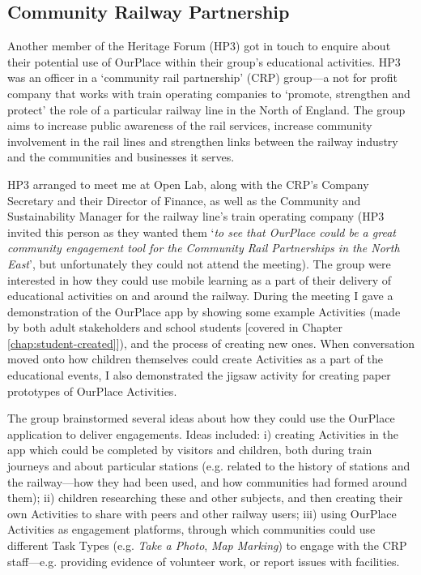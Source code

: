 \subsection{Community Railway Partnership}

Another member of the Heritage Forum (HP3) got in touch to enquire about their potential use of OurPlace within their group's educational activities. HP3 was an officer in a `community rail partnership' (CRP) group---a not for profit company that works with train operating companies to `promote, strengthen and protect' the role of a particular railway line in the North of England. The group aims to increase public awareness of the rail services, increase community involvement in the rail lines and strengthen links between the railway industry and the communities and businesses it serves.

HP3 arranged to meet me at Open Lab, along with the CRP's Company Secretary and their Director of Finance, as well as the Community and Sustainability Manager for the railway line's train operating company (HP3 invited this person as they wanted them `\textit{to see that OurPlace could be a great community engagement tool for the Community Rail Partnerships in the North East}', but unfortunately they could not attend the meeting). The group were interested in how they could use mobile learning as a part of their delivery of educational activities on and around the railway. During the meeting I gave a demonstration of the OurPlace app by showing some example Activities (made by both adult stakeholders and school students [covered in Chapter \ref{chap:student-created}]), and the process of creating new ones. When conversation moved onto how children themselves could create Activities as a part of the educational events, I also demonstrated the jigsaw activity for creating paper prototypes of OurPlace Activities.

The group brainstormed several ideas about how they could use the OurPlace application to deliver engagements. Ideas included: i) creating Activities in the app which could be completed by visitors and children, both during train journeys and about particular stations (e.g. related to the history of stations and the railway---how they had been used, and how communities had formed around them); ii) children researching these and other subjects, and then creating their own Activities to share with peers and other railway users; iii) using OurPlace Activities as engagement platforms, through which communities could use different Task Types (e.g. \textit{Take a Photo},\textit{ Map Marking}) to engage with the CRP staff---e.g. providing evidence of volunteer work, or report issues with facilities. 

